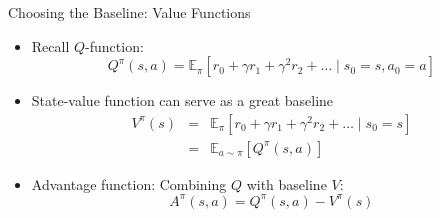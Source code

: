 \begin{frame}[c]{Choosing the Baseline: Value Functions}
	
	\begin{itemize}
		\item Recall $Q$-function:
		$$Q^\pi(s,a) = \mathbb{E}_\pi [r_0 +  \gamma r_1 + \gamma^2 r_2 + \ldots \mid s_0 = s, a_0 = a ]$$
		\item State-value function can serve as a great baseline
		\begin{eqnarray}
		V^\pi (s) &=& \mathbb{E}_\pi [r_0 +  \gamma r_1 + \gamma^2 r_2 + \ldots \mid s_0 = s]\nonumber\\	
		&=& \mathbb{E}_{a\sim\pi} [Q^\pi(s,a)]\nonumber
		\end{eqnarray}
		\item Advantage function: Combining $Q$ with baseline $V$:
		$$A^\pi(s,a) = Q^\pi(s,a) - V^\pi(s) $$
	\end{itemize}
	
\end{frame}

